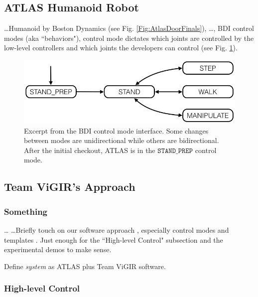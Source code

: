 
\subsection{ATLAS Humanoid Robot}

\ldots Humanoid by Boston Dynamics (see Fig. \ref{Fig:AtlasDoorFinals}), \ldots, BDI control modes (aka ``behaviors"), control mode dictates which joints are controlled by the low-level controllers and which joints the developers can control (see Fig. \ref{Fig:ControlModeTS}).

\begin{figure}[t]
\centering
\includegraphics[width=0.99\columnwidth,clip]{./img/control_modes_ts.png}
\caption{Excerpt from the BDI control mode interface.
Some changes between modes are unidirectional while others are bidirectional.
After the initial checkout, ATLAS is in the $\mathtt{STAND\_PREP}$ control mode.
}
\label{Fig:ControlModeTS}
\end{figure}

\subsection{Team ViGIR's Approach}

\subsubsection{Something}  \ldots \cite{ROS2009ICRA, ROS} \ldots Briefly touch on our software approach \cite{TeamViGIR2014JFR}, especially control modes and templates \cite{Alberto2014Humanoids}. Just enough for the ``High-level Control" subsection and the experimental demos to make sense.

Define \emph{system} as ATLAS plus Team ViGIR software.

\subsubsection{High-level Control}\label{S:FlexBE}

